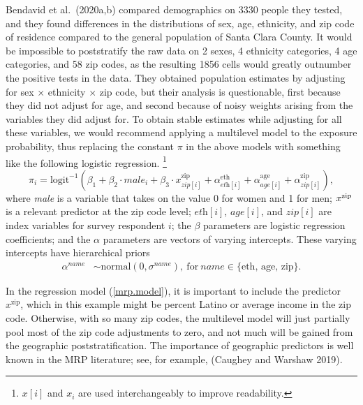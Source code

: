 \documentclass[11pt]{article}
\begin{document}
Bendavid et al.\ (2020a,b) compared demographics on 3330 people they
tested, and they found differences in the distributions of sex, age,
ethnicity, and zip code of residence compared to the general
population of Santa Clara County. It would be impossible to
poststratify the raw data on 2 sexes, 4 ethnicity categories, 4 age
categories, and 58 zip codes, as the resulting 1856 cells would
greatly outnumber the positive tests in the data.  They obtained
population estimates by adjusting for sex $\times$ ethnicity $\times$
zip code, but their analysis is questionable, first because they did
not adjust for age, and second because of noisy weights arising from
the variables they did adjust for.  To obtain stable estimates while
adjusting for all these variables, we would recommend applying a
multilevel model to the exposure probability, thus replacing the
constant $\pi$ in the above models with something like the following logistic
regression.%
%
\footnote{$x[i]$ and $x_i$ are used interchangeably to improve readability.}
%
\begin{equation}\label{mrp.model}
\pi_i = \mbox{logit}^{-1}(\beta_1 + \beta_2 \cdot \textit{male}_i + \beta_3 \cdot x^{\textrm{zip}}_{\textit{zip}[i]} + \alpha^{\textrm{eth}}_{\textit{eth}[i]} + \alpha^{\textrm{age}}_{\textit{age}[i]} + \alpha^{\textrm{zip}}_{\textit{zip}[i]}),
\end{equation}
%
where {\it male} is a variable that takes on the value 0 for women and
1 for men; $x^{\rm zip}$ is a relevant predictor at the zip code
level; $\textit{eth}[i]$, $\textit{age}[i]$, and $\textit{zip}[i]$ are
index variables for survey respondent $i$; the $\beta$ parameters are logistic
regression coefficients; and the $\alpha$ parameters are vectors of varying
intercepts.  These varying intercepts have hierarchical priors
%
\begin{align*}
  \alpha^{\textit{name}} &\sim \mbox{normal}(0, \sigma^{\textit{name}}), \ \textrm{for} \ \textit{name} \in \{ \textrm{eth, age, zip} \}.
\end{align*}
%

In the regression model (\ref{mrp.model}), it is important to include
the predictor $x^{\textrm{zip}}$, which in this example might be
percent Latino or average income in the zip code.  Otherwise, with so
many zip codes, the multilevel model will just partially pool most of
the zip code adjustments to zero, and not much will be gained from the
geographic poststratification.  The importance of geographic
predictors is well known in the MRP literature; see, for example,
(Caughey and Warshaw 2019).
\end{document}
